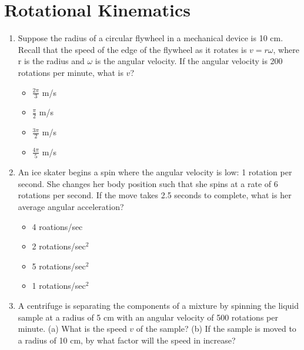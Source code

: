 \documentclass[10pt]{article}
\begin{document}
\maketitle

\section{Rotational Kinematics}
\begin{enumerate}
\item Suppose the radius of a circular flywheel in a mechanical device is 10 cm.  Recall that the speed of the edge of the flywheel as it rotates is $v = r\omega$, where r is the radius and $\omega$ is the angular velocity.  If the angular velocity is 200 rotations per minute, what is $v$?
\begin{itemize}
\item $\frac{2\pi}{3}$ m/s
\item $\frac{\pi}{2}$ m/s
\item $\frac{3\pi}{2}$ m/s
\item $\frac{4\pi}{5}$ m/s
\end{itemize}
\item An ice skater begins a spin where the angular velocity is low: 1 rotation per second.  She changes her body position such that she spins at a rate of 6 rotations per second.  If the move takes 2.5 seconds to complete, what is her average angular acceleration?
\begin{itemize}
\item 4 roations/sec
\item 2 rotations/sec$^2$
\item 5 rotations/sec$^2$
\item 1 rotations/sec$^2$
\end{itemize}
\item A centrifuge is separating the components of a mixture by spinning the liquid sample at a radius of 5 cm with an angular velocity of 500 rotations per minute.  (a) What is the speed $v$ of the sample?  (b) If the sample is moved to a radius of 10 cm, by what factor will the speed in increase? \\ \vspace{1.5cm}
\end{enumerate}
\end{document}
